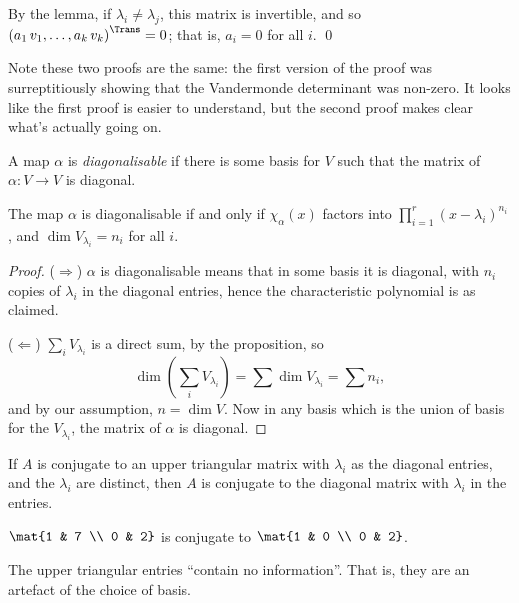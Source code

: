 By the lemma, if $\lambda_i\neq \lambda_j$, this matrix is invertible, and so $\left(a_1 \, v_1, \ldots, a_k \, v_k\right)^\Trans=0$; that is, $a_i=0$ for all $i$. \qed

Note these two proofs are the same: the first version of the proof was surreptitiously showing that the Vandermonde determinant was non-zero. It looks like the first proof is easier to understand, but the second proof makes clear what's actually going on.

	\pagebreak

\begin{definition}
	A map $\alpha$ is \emph{diagonalisable} if there is some basis for $V$ such that the matrix of $\alpha:V\to V$ is diagonal. %
\end{definition}

\begin{corollary}
	The map $\alpha$ is diagonalisable if and only if $\chi_\alpha(x)$ factors into $\prod_{i=1}^r \left( x-\lambda_i \right)^{n_i}$, and $\dim V_{\lambda_i} = n_i$ for all $i$. %
\end{corollary}

\begin{proof}
	($\Rightarrow$) $\alpha$ is diagonalisable means that in some basis it is diagonal, with $n_i$ copies of $\lambda_i$ in the diagonal entries, hence the characteristic polynomial is as claimed. %
	
	($\Leftarrow$) $\sum_i V_{\lambda_i}$ is a direct sum, by the proposition, so
	\begin{equation*}
		\textstyle
		\dim\left( \sum_i V_{\lambda_i} \right)
		= \sum \dim V_{\lambda_i}
		= \sum n_i,
	\end{equation*}
	and by our assumption, $n=\dim V$. Now in any basis which is the union of basis for the $V_{\lambda_i}$, the matrix of $\alpha$ is diagonal. %
\end{proof}

\begin{corollary}
	If $A$ is conjugate to an upper triangular matrix with $\lambda_i$ as the diagonal entries, and the $\lambda_i$ are distinct, then $A$ is conjugate to the diagonal matrix with $\lambda_i$ in the entries. %
\end{corollary}

\begin{example}
	$\mat{1 & 7 \\ 0 & 2}$ is conjugate to $\mat{1 & 0 \\ 0 & 2}$. %
	
	The upper triangular entries ``contain no information''. That is, they are an artefact of the choice of basis. %
\end{example}

